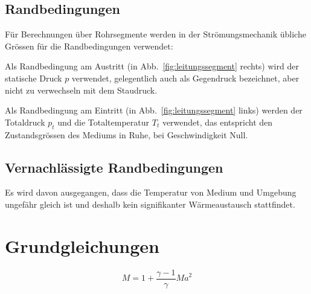 \documentclass[a4paper,10pt,twocolumn]{article}
\begin{document}
\subsection{Randbedingungen}

Für Berechnungen über Rohrsegmente werden in der Strömungsmechanik übliche Grössen für die Randbedingungen verwendet:

Als Randbedingung am Austritt (in Abb.~\ref{fig:leitungssegment} rechts) wird der statische Druck $p$ verwendet, gelegentlich auch als Gegendruck bezeichnet, aber nicht zu verwechseln mit dem Staudruck.

Als Randbedingung am Eintritt (in Abb.~\ref{fig:leitungssegment} links) werden der Totaldruck $p_t$ und die Totaltemperatur $T_t$ verwendet, das entspricht den Zustandsgrössen des Mediums in Ruhe, bei Geschwindigkeit Null.

\subsection{Vernachlässigte Randbedingungen}

Es wird davon ausgegangen, dass die Temperatur von Medium und Umgebung ungefähr gleich ist und deshalb kein signifikanter Wärmeaustausch stattfindet.


\section{Grundgleichungen}

\begin{equation}
M = 1 + \frac{\gamma-1}{\gamma} \mathit{Ma}^2
\end{equation}
\end{document}
